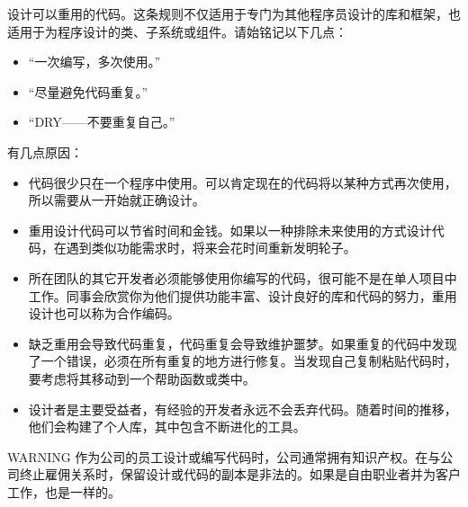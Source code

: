 设计可以重用的代码。这条规则不仅适用于专门为其他程序员设计的库和框架，也适用于为程序设计的类、子系统或组件。请始铭记以下几点：

\begin{itemize}
\item
“一次编写，多次使用。”

\item
“尽量避免代码重复。”

\item
“DRY——不要重复自己。”
\end{itemize}

有几点原因：

\begin{itemize}
\item
代码很少只在一个程序中使用。可以肯定现在的代码将以某种方式再次使用，所以需要从一开始就正确设计。

\item
重用设计代码可以节省时间和金钱。如果以一种排除未来使用的方式设计代码，在遇到类似功能需求时，将来会花时间重新发明轮子。

\item
所在团队的其它开发者必须能够使用你编写的代码，很可能不是在单人项目中工作。同事会欣赏你为他们提供功能丰富、设计良好的库和代码的努力，重用设计也可以称为合作编码。

\item
缺乏重用会导致代码重复，代码重复会导致维护噩梦。如果重复的代码中发现了一个错误，必须在所有重复的地方进行修复。当发现自己复制粘贴代码时，要考虑将其移动到一个帮助函数或类中。

\item
设计者是主要受益者，有经验的开发者永远不会丢弃代码。随着时间的推移，他们会构建了个人库，其中包含不断进化的工具。
\end{itemize}

\begin{myWarning}{WARNING}
作为公司的员工设计或编写代码时，公司通常拥有知识产权。在与公司终止雇佣关系时，保留设计或代码的副本是非法的。如果是自由职业者并为客户工作，也是一样的。
\end{myWarning}







